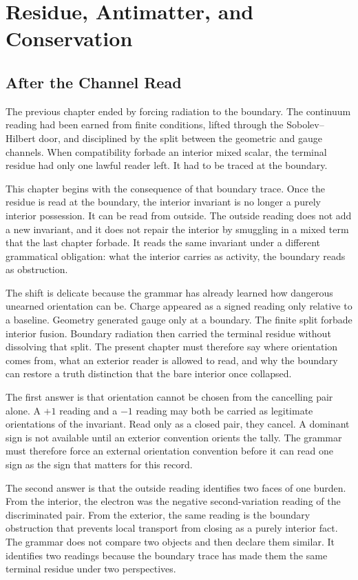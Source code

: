 \chapter{Residue, Antimatter, and Conservation}
\label{chap:outside-reading-godel-obstruction}

\section{After the Channel Read}

The previous chapter ended by forcing radiation to the boundary. The
continuum reading had been earned from finite conditions, lifted through the
Sobolev--Hilbert door, and disciplined by the split between the geometric and
gauge channels. When compatibility forbade an interior mixed scalar, the
terminal residue had only one lawful reader left. It had to be traced at the
boundary.

This chapter begins with the consequence of that boundary trace. Once the
residue is read at the boundary, the interior invariant is no longer a purely
interior possession. It can be read from outside. The outside reading does
not add a new invariant, and it does not repair the interior by smuggling in a
mixed term that the last chapter forbade. It reads the same invariant under a
different grammatical obligation: what the interior carries as activity, the
boundary reads as obstruction.

The shift is delicate because the grammar has already learned how dangerous
unearned orientation can be. Charge appeared as a signed reading only
relative to a baseline. Geometry generated gauge only at a boundary. The
finite split forbade interior fusion. Boundary radiation then carried the
terminal residue without dissolving that split. The present chapter must
therefore say where orientation comes from, what an exterior reader is allowed
to read, and why the boundary can restore a truth distinction that the bare
interior once collapsed.

The first answer is that orientation cannot be chosen from the cancelling
pair alone. A \(+1\) reading and a \(-1\) reading may both be carried as
legitimate orientations of the invariant. Read only as a closed pair, they
cancel. A dominant sign is not available until an exterior convention orients
the tally. The grammar must therefore force an external orientation
convention before it can read one sign as the sign that matters for this
record.

The second answer is that the outside reading identifies two faces of one
burden. From the interior, the electron was the negative second-variation
reading of the discriminated pair. From the exterior, the same reading is the
boundary obstruction that prevents local transport from closing as a purely
interior fact. The grammar does not compare two objects and then declare them
similar. It identifies two readings because the boundary trace has made them
the same terminal residue under two perspectives.

